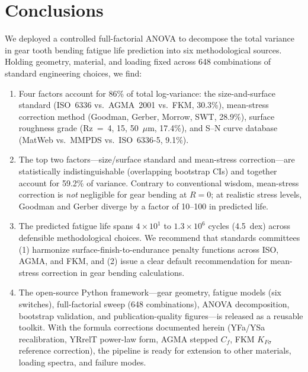 \documentclass[12pt,a4paper]{article}
\begin{document}
\section{Conclusions}
\label{sec:conclusions}

We deployed a controlled full-factorial ANOVA to decompose the total
variance in gear tooth bending fatigue life prediction into six
methodological sources. Holding geometry, material, and loading fixed
across 648 combinations of standard engineering choices, we find:

\begin{enumerate}
  \item Four factors account for 86\% of total log-variance: the
        size-and-surface standard (ISO~6336 vs.\ AGMA~2001 vs.\ FKM,
        30.3\%), mean-stress correction method (Goodman, Gerber, Morrow,
        SWT, 28.9\%), surface roughness grade (Rz~=~4, 15, 50~$\mu$m,
        17.4\%), and S--N curve database (MatWeb vs.\ MMPDS vs.\
        ISO~6336-5, 9.1\%).
  \item The top two factors---size/surface standard and mean-stress
        correction---are statistically indistinguishable (overlapping
        bootstrap CIs) and together account for 59.2\% of variance.
        Contrary to conventional wisdom, mean-stress correction is
        \emph{not} negligible for gear bending at $R=0$; at realistic
        stress levels, Goodman and Gerber diverge by a factor of 10--100
        in predicted life.
  \item The predicted fatigue life spans $4\times10^1$ to
        $1.3\times10^6$ cycles (4.5~dex) across defensible methodological
        choices. We recommend that standards committees (1) harmonize
        surface-finish-to-endurance penalty functions across ISO, AGMA,
        and FKM, and (2) issue a clear default recommendation for
        mean-stress correction in gear bending calculations.
  \item The open-source Python framework---gear geometry, fatigue
        models (six switches), full-factorial sweep (648 combinations),
        ANOVA decomposition, bootstrap validation, and publication-quality
        figures---is released as a reusable toolkit. With the formula
        corrections documented herein (YFa/YSa recalibration, YRrelT
        power-law form, AGMA stepped $C_f$, FKM $K_{F\sigma}$ reference
        correction), the pipeline is ready for extension to other materials,
        loading spectra, and failure modes.
\end{enumerate}
\end{document}
